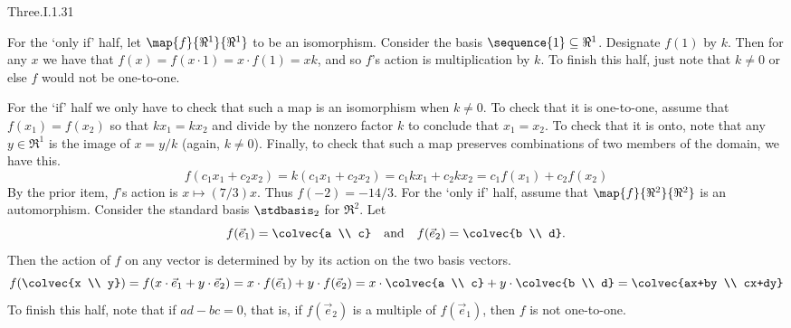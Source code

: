 \begin{ans}{Three.I.1.31}
      \begin{exparts}
        \partsitem For the `only if' half, let \( \map{f}{\Re^1}{\Re^1} \)
          to be an isomorphism.
          Consider the basis \( \sequence{1}\subseteq\Re^1 \).
          Designate \( f(1) \) by \( k \).
          Then for any \( x \) we have that
          \( f(x)=f(x\cdot 1)=x\cdot f(1)=xk \), and so $f$'s action is
          multiplication by $k$.
          To finish this half, just note that
          \( k\neq 0 \) or else $f$ would not be one-to-one.

          For the `if' half we only have to check that such a map is an
          isomorphism when $k\neq 0$.
          To check that it is one-to-one, assume that \( f(x_1)=f(x_2) \)
          so that \( kx_1=kx_2 \) and
          divide by the nonzero factor \( k \) to conclude that $x_1=x_2$.
          To check that it is onto, note that any \( y\in\Re^1 \)
          is the image of \( x=y/k \) (again, $k\neq 0$).
          Finally, to check that such a map preserves combinations of
          two members of the domain,
          we have this.
          \begin{equation*}
            f(c_1x_1+c_2x_2)
            =k(c_1x_1+c_2x_2)
            =c_1kx_1+c_2kx_2
            =c_1f(x_1)+c_2f(x_2)
          \end{equation*}
        \partsitem By the prior item, $f$'s action is \( x\mapsto (7/3)x \).
          Thus \( f(-2)=-14/3 \).
        \partsitem For the `only if' half,
          assume that \( \map{f}{\Re^2}{\Re^2} \) is an automorphism.
          Consider the standard basis \( \stdbasis_2 \) for \( \Re^2 \).
          Let
          \begin{equation*}
            f(\vec{e}_1)=\colvec{a \\ c}
            \quad\text{and}\quad
            f(\vec{e}_2)=\colvec{b \\ d}.
          \end{equation*}
          Then the action of $f$ on any vector is determined by
          by its action on the two basis vectors.
          \begin{equation*}
            f(\colvec{x \\ y})
            =f(x\cdot\vec{e}_1+y\cdot\vec{e}_2)
            =x\cdot f(\vec{e}_1)+y\cdot f(\vec{e}_2)
            =x\cdot\colvec{a \\ c}+y\cdot\colvec{b \\ d}
            =\colvec{ax+by \\ cx+dy}
          \end{equation*}
          To finish this half,
          note that if \( ad-bc=0 \), that is,
          if \( f(\vec{e}_2) \) is a multiple of \( f(\vec{e}_1) \),
          then \( f \) is not one-to-one.


\end{exparts}
\end{ans}
